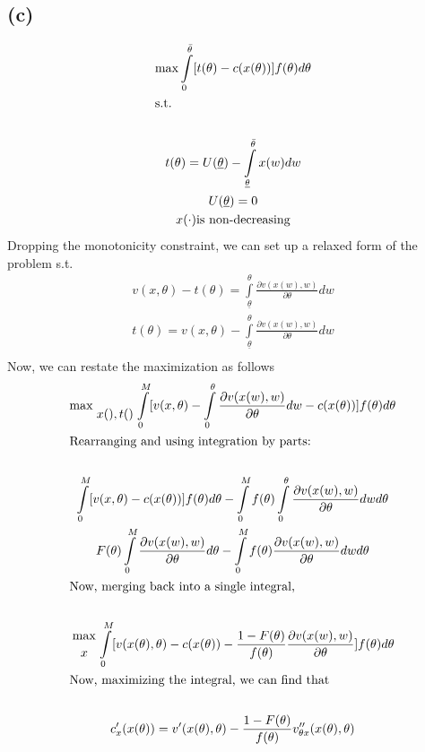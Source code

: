 \documentclass[10pt,a4paper]{article}
\begin{document}
  \subsection*{(c)}
    \begin{gather*}
      \max\int\limits_0^{\bar{\theta}}[t(\theta) - 
      c(x(\theta))]f(\theta)d\theta \\
      \shortintertext{s.t.} \\
      t(\theta) = U(\underline{\theta}) - 
      \int\limits_{\underline{\theta}}^{\bar{\theta}}x(w)dw \\
      U(\underline{\theta}) = 0 \\
      x(\cdot) \text{is non-decreasing} \\
    \end{gather*}
    Dropping the monotonicity constraint, we can set up a relaxed form of the problem s.t.
    \begin{gather*}
      v(x,\theta) - t(\theta) = 
      \int\limits_{\underline{\theta}}^{\theta}\frac{\partial v(x(w),
      w)}{\partial\theta}dw \\
      t(\theta) = v(x,\theta) -
      \int\limits_{\underline{\theta}}^{\theta}\frac{\partial v(x(w),
      w)}{\partial\theta}dw \\
    \end{gather*}
    Now, we can restate the maximization as follows
    \begin{gather*}
      \max{\atop{x(),t()}}\int\limits_0^M[v(x,\theta) - 
      \int\limits_0^{\theta}\frac{\partial v(x(w),
      w)}{\partial\theta}dw - c(x(\theta))] f(\theta)d\theta \\
      \shortintertext{Rearranging and using integration by parts:} \\
      \int\limits_0^M[v(x,\theta) - c(x(\theta))]f(\theta)d\theta - \int
      \limits_0^Mf(\theta)\int\limits_0^{\theta}\frac{\partial v(x(w),w)}
      {\partial\theta}dwd\theta \\
      F(\theta)\int\limits_0^M\frac{\partial v(x(w), w)}{\partial\theta}d\theta -\int\limits_0^M f(\theta)\frac{\partial v(x(w),w)}{\partial\theta}dwd\theta \\
      \shortintertext{Now, merging back into a single integral,} \\
      {\max\atop{x}}\int\limits_0^M[v(x(\theta),\theta)-c(x(\theta)) - 
      \frac{1-F(\theta)}{f(\theta)}\frac{\partial v(x(w),w)}{\partial\theta}]f(\theta)d\theta \\
      \shortintertext{Now, maximizing the integral, we can find that} \\
      c'_x(x(\theta)) = v'(x(\theta),\theta) - \frac{1- 
      F(\theta)}{f(\theta)}v''_{\theta x}(x(\theta),\theta)
    \end{gather*}
\end{document}
